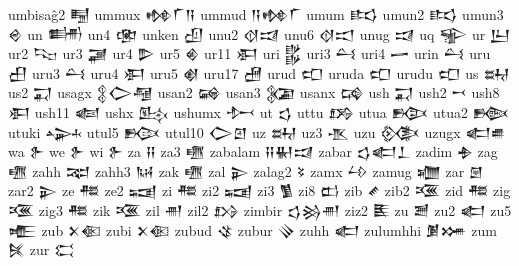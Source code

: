  umbisaĝ2  𒋄   
 ummux  𒂔𒇲𒀀    
 ummud  𒀀𒂔𒇲    
 umum  𒌣   
 umun2  𒌣   
 umun3  𒄴   
 un  𒌦   
 un4  𒂬   
 unken  𒌺   
 unu2  𒋼𒀕    
 unu6  𒋼𒀊    
 unug  𒀕   
 uq  𒊌   
 ur  𒌨   
 ur2  𒌫   
 ur3  𒃡   
 ur4  𒌴   
 ur5  𒄯   
 ur11  𒀳   
 uri  𒌵   
 uri3  𒌶   
 uri4  𒅂   
 urin  𒌶   
 uru  𒌷   
 uru3  𒌶   
 uru4  𒀳   
 uru5  𒋽   
 uru17  𒍇   
 urud  𒍏   
 uruda  𒍏   
 urudu  𒍏   
 us  𒊻   
 us2  𒍑   
 usagx  𒉭𒀖𒆷        
 usan2  𒄝   
 usan3  𒉮   
 usanx  𒄙   
 ush  𒍑   
 ush2  𒍗   
 ush8  𒀳   
 ush11  𒅜   
 ushx  𒍖   
 ushumx  𒍘   
 ut  𒌓   
 uttu  𒋸   
 utua  𒁭   
 utua2  𒁦   
 utuki  𒍙   
 utul5  𒁟   
 utul10  𒀖𒇻    
 uz  𒊻   
 uz3  𒍚   
 uzu  𒍜   
 uzugx  𒅗𒌑    
 wa  𒉿   
 we  𒉿   
 wi  𒉿   
 za  𒍝   
 za3  𒍠   
 zabalam  𒍝𒈽𒀕    
 zabar  𒌓𒅗𒁇    
 zadim  𒈯   
 zag  𒍠   
 zahh  𒉈   
 zahh3  𒀄   
 zak  𒍠   
 zal  𒉌   
 zalag2  𒂟   
 zamx  𒍡   
 zamug  𒁾   
 zar  𒇡   
 zar2  𒉌   
 ze  𒍣   
 ze2  𒍢   
 zi  𒍣   
 zi2  𒍢   
 zi3  𒍥   
 zi8  𒆗   
 zib  𒍦   
 zib2  𒍨   
 zid  𒍣   
 zig  𒍨   
 zig3  𒍣   
 zik  𒍨   
 zil  𒉣   
 zil2  𒋳   
 zimbir  𒌓𒄒𒉣    
 ziz2  𒍩   
 zu  𒍪   
 zu2  𒅗   
 zu5  𒍫   
 zub  𒉽𒈿    
 zubi  𒉽𒈿    
 zubud  𒄪   
 zubur  𒍭   
 zuhh  𒅗   
 zulumhhi  𒋠𒋤    
 zum  𒍮   
 zur  𒀫   
